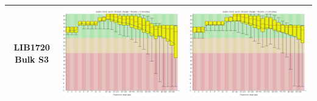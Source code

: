 \begin{center}
\begin{tabular}{ccc}
\begin{sideways}LIB1720 Bulk S3 \end{sideways} & \includegraphics[width=0.4 \textwidth]{Appendices/images/Sample_LIB1720_base_quality_R1.png} & \includegraphics[width=0.4 \textwidth]{Appendices/images/Sample_LIB1720_base_quality_R2.png} \\ 
\bottomrule
\end{tabular}
\end{center}


\newpage


